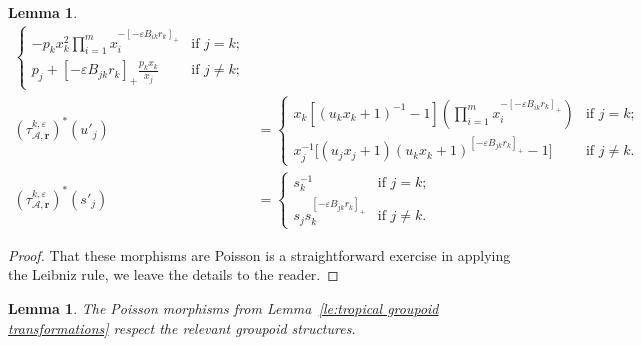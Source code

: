 \documentclass{amsart}
\newtheorem{lemma}[theorem]{Lemma}
\numberwithin{equation}{section}
\newcommand{\bfr}{{\boldsymbol{r}}}
\newcommand{\cA}{\mathcal{A}}
\begin{document}
\begin{lemma}
\begin{align}
    \begin{cases} 
      -p_k x_k^2 \prod\limits_{i=1}^m x_i^{-[-\varepsilon B_{ik} r_k]_+} & \text{if $j=k$;}\\ 
      p_j + [-\varepsilon B_{jk} r_k]_+ \frac{p_k x_k}{x_j} & \text{if $j\ne k$;}
    \end{cases}\\
    \label{eq:tropical BA transformation}
    (\tau_{\cA,\bfr}^{k,\varepsilon})^*(u'_j)
    &=\begin{cases} 
      x_k \left[ (u_k x_k +1)^{-1} -1\right] \left(\prod_{i=1}^m x_i^{-[-\varepsilon B_{ik} r_k]_+}\right) & \text{if $j=k$;}\\ 
      x_j^{-1}\big[(u_j x_j + 1) (u_k x_k + 1)^{[-\varepsilon B_{jk} r_k]_+}-1\big] & \text{if $j\ne k$.}
    \end{cases}\\
    \label{eq:tropical DA transformation}
    (\tau_{\cA,\bfr}^{k,\varepsilon})^*(s'_j)
    &=\begin{cases} 
      s_k^{-1} & \text{if $j=k$;}\\ 
      s_j s_k^{[-\varepsilon B_{jk} r_k]_+} & \text{if $j\ne k$.}
    \end{cases}
  \end{align}
\end{lemma}
\begin{proof}
  That these morphisms are Poisson is a straightforward exercise in applying the Leibniz rule, we leave the details to the reader.
\end{proof}

\begin{lemma}
  The Poisson morphisms from Lemma~\ref{le:tropical groupoid transformations} respect the relevant groupoid structures.
\end{lemma}
\end{document}
